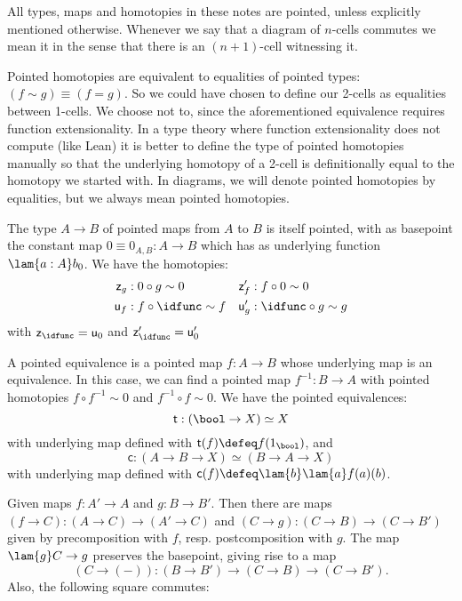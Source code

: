 \documentclass{article}
\newcommand{\pmap}{\to}
\renewcommand{\o}{\ensuremath{\circ}}
\newcommand{\sy}{^{-1}}
\newcommand{\zeroh}{\mathsf{z}}
\newcommand{\oneh}{\mathsf{u}}
\newcommand{\two}{\mathsf{t}}
\newcommand{\twist}{\mathsf{c}}
\begin{document}
\begin{rmk}\label{rmk:pointed-types}
  All types, maps and homotopies in these notes are pointed, unless explicitly mentioned
  otherwise. Whenever we say that a diagram of $n$-cells commutes we mean it in the sense that there
  is an $(n+1)$-cell witnessing it.
\item Pointed homotopies are equivalent to equalities of pointed types: $(f\sim g)\equiv (f=g)$. So
  we could have chosen to define our 2-cells as equalities between 1-cells. We choose not to, since
  the aforementioned equivalence requires function extensionality. In a type theory where function
  extensionality does not compute (like Lean) it is better to define the type of pointed homotopies
  manually so that the underlying homotopy of a 2-cell is definitionally equal to the homotopy we
  started with. In diagrams, we will denote pointed homotopies by equalities, but we always mean
  pointed homotopies.
\item The type $A\to B$ of pointed maps from $A$ to $B$ is itself pointed, with as basepoint the
  constant map $0\equiv0_{A,B}:A\to B$ which has as underlying function $\lam{a:A}b_0$. We have the homotopies:
  \begin{align*}
  \zeroh_g &: 0 \o g \sim 0 & \zeroh'_f &: f \o 0 \sim 0\\
  \oneh_f &: f \o \idfunc \sim f & \oneh'_g &: \idfunc \o g \sim g
  \end{align*}
  with $\zeroh_{\idfunc} = \oneh_0$ and $\zeroh'_{\idfunc} = \oneh'_0$
\item A pointed equivalence is a pointed map $f : A \to B$ whose underlying map is an
  equivalence. In this case, we can find a pointed map $f\sy:B\to A$ with pointed homotopies
  $f\o f\sy\sim0$ and $f\sy\o f\sim0$. We have the pointed equivalences:
  \[\two : (\bool \to X) \simeq X\] with underlying map defined with $\two(f) \defeq f(1_\bool)$, and
  \[\twist : (A \to B \to X) \simeq (B \to A \to X)\]
  with underlying map defined with $\twist(f) \defeq \lam{b}\lam{a}f(a)(b)$.
\end{rmk}

\begin{lem}
  Given maps $f:A'\pmap A$ and $g:B\pmap B'$. Then there are maps
  $(f\pmap C):(A\pmap C)\pmap(A'\pmap C)$ and $(C\pmap g):(C\pmap B)\pmap(C\pmap B')$ given by
  precomposition with $f$, resp. postcomposition with $g$. The map $\lam{g}C\pmap g$ preserves the basepoint, giving rise to a map $$(C\pmap ({-})):(B\pmap B')\pmap(C\pmap B)\pmap(C\pmap B').$$
  Also, the following square commutes:
\begin{center}
\end{center}

\end{lem}
\end{document}
